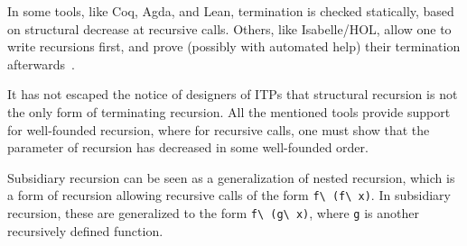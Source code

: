 \documentclass[a4paper,USenglish]{lipics-v2021}
\begin{document}
In some tools, like Coq, Agda, and Lean, termination is checked
statically, based on structural decrease at recursive calls.  Others,
like Isabelle/HOL, allow one to write recursions first, and prove
(possibly with automated help) their termination
afterwards~\cite{krauss}.

It has not escaped the notice of designers of ITPs that structural
recursion is not the only form of terminating recursion.  All the
mentioned tools provide support for well-founded recursion, where for
recursive calls, one must show that the parameter of recursion has
decreased in some well-founded order.

Subsidiary recursion can be seen as a generalization
of nested recursion, which is a form of recursion allowing recursive
calls of the form \verb|f\ (f\ x)|.  In subsidiary recursion, these
are generalized to the form \verb|f\ (g\ x)|, where \verb|g| is
another recursively defined function.


\end{document}

